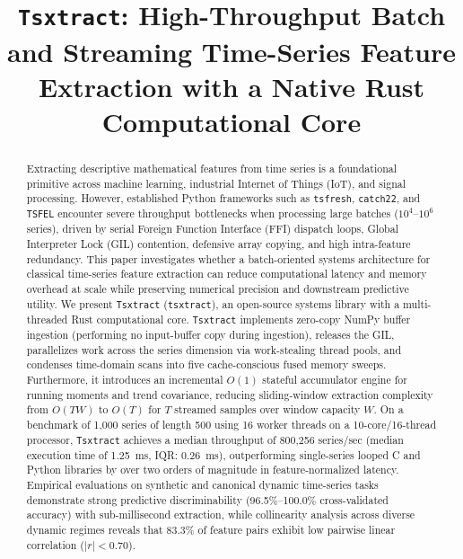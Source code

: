 \documentclass[conference]{IEEEtran}
\newcommand{\tsxtract}{\texttt{Tsxtract}}
\newcommand{\tsfresh}{\texttt{tsfresh}}
\newcommand{\catchtwentytwo}{\texttt{catch22}}
\newcommand{\tsfel}{\texttt{TSFEL}}
\begin{document}
\title{\tsxtract{}: High-Throughput Batch and Streaming Time-Series Feature Extraction with a Native Rust Computational Core}

\author{
}

\maketitle

\begin{abstract}
Extracting descriptive mathematical features from time series is a foundational primitive across machine learning, industrial Internet of Things (IoT), and signal processing. However, established Python frameworks such as \tsfresh{}, \catchtwentytwo{}, and \tsfel{} encounter severe throughput bottlenecks when processing large batches ($10^4$--$10^6$ series), driven by serial Foreign Function Interface (FFI) dispatch loops, Global Interpreter Lock (GIL) contention, defensive array copying, and high intra-feature redundancy. This paper investigates whether a batch-oriented systems architecture for classical time-series feature extraction can reduce computational latency and memory overhead at scale while preserving numerical precision and downstream predictive utility. We present \tsxtract{} (\texttt{tsxtract}), an open-source systems library with a multi-threaded Rust computational core. \tsxtract{} implements zero-copy NumPy buffer ingestion (performing no input-buffer copy during ingestion), releases the GIL, parallelizes work across the series dimension via work-stealing thread pools, and condenses time-domain scans into five cache-conscious fused memory sweeps. Furthermore, it introduces an incremental $O(1)$ stateful accumulator engine for running moments and trend covariance, reducing sliding-window extraction complexity from $O(TW)$ to $O(T)$ for $T$ streamed samples over window capacity $W$. On a benchmark of 1,000 series of length 500 using 16 worker threads on a 10-core/16-thread processor, \tsxtract{} achieves a median throughput of 800,256 series/sec (median execution time of 1.25~ms, IQR: 0.26~ms), outperforming single-series looped C and Python libraries by over two orders of magnitude in feature-normalized latency. Empirical evaluations on synthetic and canonical dynamic time-series tasks demonstrate strong predictive discriminability (96.5\%--100.0\% cross-validated accuracy) with sub-millisecond extraction, while collinearity analysis across diverse dynamic regimes reveals that 83.3\% of feature pairs exhibit low pairwise linear correlation ($|r| < 0.70$).
\end{abstract}
\end{document}

